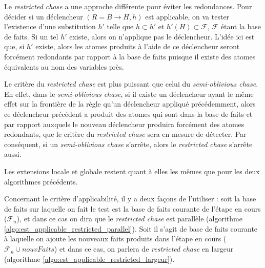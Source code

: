 Le \textit{restricted chase} a une approche différente pour éviter les redondances. Pour décider si un déclencheur $(R = B \rightarrow H,h)$ est applicable, on va tester l'existence d'une substitution $h'$ telle que $h \subset h'$ et $h'(H) \subset \mathcal{F}$, $\mathcal{F}$ étant la base de faits. Si un tel $h'$ existe, alors on n'applique pas le déclencheur. L'idée ici est que, si $h'$ existe, alors les atomes produits à l'aide de ce déclencheur seront forcément redondants par rapport à la base de faits puisque il existe des atomes équivalents au nom des variables près.
\par Le critère du \textit{restricted chase} est plus puissant que celui du \textit{semi-oblivious chase}. En effet, dans le \textit{semi-oblivious chase}, si il existe un déclencheur ayant le même effet sur la frontière de la règle qu'un déclencheur appliqué précédemment, alors ce déclencheur précédent a produit des atomes qui sont dans la base de faits et par rapport auxquels le nouveau déclencheur produira forcément des atomes redondants, que le critère du \textit{restricted chase} sera en mesure de détecter. Par conséquent, si un \textit{semi-oblivious chase} s'arrête, alors le \textit{restricted chase} s'arrête aussi.
\par Les extensions locale et globale restent quant à elles les mêmes que pour les deux algorithmes précédents.
\par Concernant le critère d'applicabilité, il y a deux façons de l'utiliser : soit la base de faits sur laquelle on fait le test est la base de faits courante de l'étape en cours ($\mathcal{F}_n$), et dans ce cas on dira que le \textit{restricted chase} est parallèle (algorithme \ref{algo:est_applicable_restricted_parallel}). Soit il s'agit de base de faits courante à laquelle on ajoute les nouveaux faits produits dans l'étape en cours ($\mathcal{F}_n \cup nouvFaits$) et dans ce cas, on parlera de \textit{restricted chase} en largeur (algorithme \ref{algo:est_applicable_restricted_largeur}).

